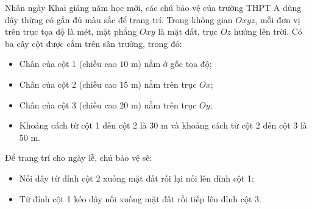 \begin{ex}%
	Nhân ngày Khai giảng năm học mới, các chú bảo vệ của trường THPT A dùng dây thừng có gắn đủ màu sắc để trang trí. Trong không gian $Oxyz$, mỗi đơn vị trên trục tọa độ là mét, mặt phẳng $Oxy$ là mặt đất, trục $Oz$ hướng lên trời. Có ba cây cột được cắm trên sân trường, trong đó:
	\begin{itemize}
		\item Chân của cột 1 (chiều cao $10$ m) nằm ở gốc tọa độ;
		\item Chân của cột 2 (chiều cao $15$ m) nằm trên trục $Ox$;
		\item Chân của cột 3 (chiều cao $20$ m) nằm trên trục $Oy$;
		\item Khoảng cách từ cột 1 đến cột 2 là $30$ m và khoảng cách từ cột 2 đến cột 3 là $50$ m.
	\end{itemize}
	Để trang trí cho ngày lễ, chú bảo vệ sẽ:
	\begin{itemize}
		\item Nối dây từ đỉnh cột 2 xuống mặt đất rồi lại nối lên đỉnh cột 1;
		\item Từ đỉnh cột 1 kéo dây nối xuống mặt đất rồi tiếp lên đỉnh cột 3.
	\end{itemize}
\end{ex}
